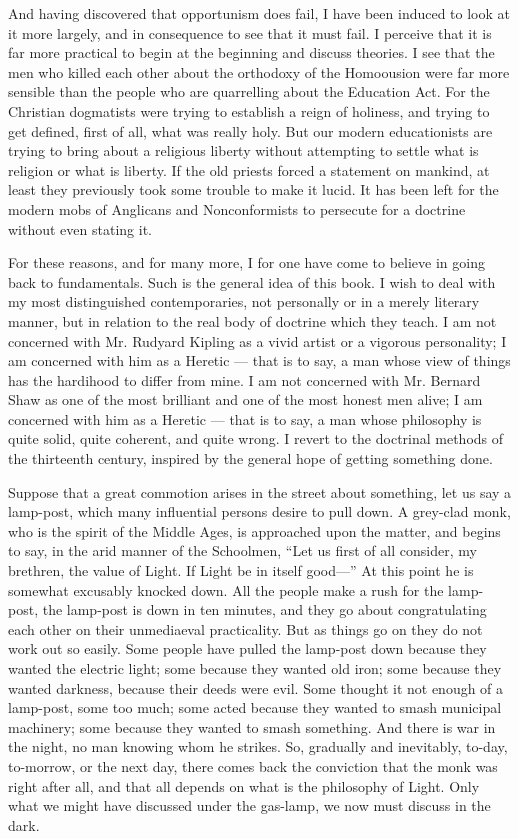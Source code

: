 And having discovered that opportunism does fail, I have been induced to look at it more largely, and in consequence to see that it must fail. I perceive that it is far more practical to begin at the beginning and discuss theories. I see that the men who killed each other about the orthodoxy of the Homoousion were far more sensible than the people who are quarrelling about the Education Act. For the Christian dogmatists were trying to establish a reign of holiness, and trying to get defined, first of all, what was really holy. But our modern educationists are trying to bring about a religious liberty without attempting to settle what is religion or what is liberty. If the old priests forced a statement on mankind, at least they previously took some trouble to make it lucid. It has been left for the modern mobs of Anglicans and Nonconformists to persecute for a doctrine without even stating it.

For these reasons, and for many more, I for one have come to believe in going back to fundamentals. Such is the general idea of this book. I wish to deal with my most distinguished contemporaries, not personally or in a merely literary manner, but in relation to the real body of doctrine which they teach. I am not concerned with Mr. Rudyard Kipling as a vivid artist or a vigorous personality; I am concerned with him as a Heretic — that is to say, a man whose view of things has the hardihood to differ from mine. I am not concerned with Mr. Bernard Shaw as one of the most brilliant and one of the most honest men alive; I am concerned with him as a Heretic — that is to say, a man whose philosophy is quite solid, quite coherent, and quite wrong. I revert to the doctrinal methods of the thirteenth century, inspired by the general hope of getting something done.

Suppose that a great commotion arises in the street about something, let us say a lamp-post, which many influential persons desire to pull down. A grey-clad monk, who is the spirit of the Middle Ages, is approached upon the matter, and begins to say, in the arid manner of the Schoolmen, “Let us first of all consider, my brethren, the value of Light. If Light be in itself good—” At this point he is somewhat excusably knocked down. All the people make a rush for the lamp-post, the lamp-post is down in ten minutes, and they go about congratulating each other on their unmediaeval practicality. But as things go on they do not work out so easily. Some people have pulled the lamp-post down because they wanted the electric light; some because they wanted old iron; some because they wanted darkness, because their deeds were evil. Some thought it not enough of a lamp-post, some too much; some acted because they wanted to smash municipal machinery; some because they wanted to smash something. And there is war in the night, no man knowing whom he strikes. So, gradually and inevitably, to-day, to-morrow, or the next day, there comes back the conviction that the monk was right after all, and that all depends on what is the philosophy of Light. Only what we might have discussed under the gas-lamp, we now must discuss in the dark.

